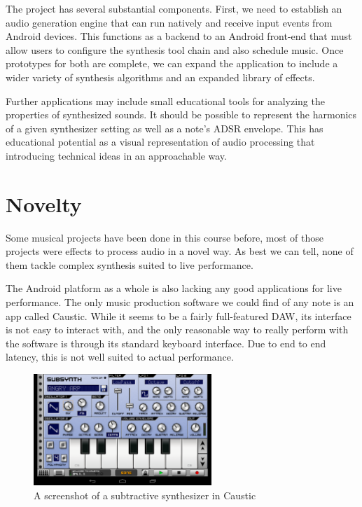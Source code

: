 \documentclass[letterpaper,12pt]{article}
\begin{document}
The project has several substantial components. First, we need to establish an
audio generation engine that can run natively and receive input events from
Android devices. This functions as a backend to an Android front-end that must
allow users to configure the synthesis tool chain and also schedule music. Once
prototypes for both are complete, we can expand the application to include
a wider variety of synthesis algorithms and an expanded library of effects.

Further applications may include small educational tools for analyzing the 
properties of synthesized sounds. It should be possible to represent the 
harmonics of a given synthesizer setting as well as a note's ADSR envelope. This 
has educational potential as a visual representation of audio processing that 
introducing technical ideas in an approachable way.


\section*{Novelty}

Some musical projects have been done in this course before, most of those
projects were effects to process audio in a novel way. As best we can tell,
none of them tackle complex synthesis suited to live performance.

The Android platform as a whole is also lacking any good applications for live
performance. The only music production software we could find of any note is an
app called Caustic\cite{caustic}. While it seems to be a fairly full-featured
DAW, its interface is not easy to interact with, and the only reasonable way to
really perform with the software is through its standard keyboard interface. Due
to end to end latency, this is not well suited to actual performance.

\begin{figure}[h]
\centering
\includegraphics[width=0.6\textwidth]{caustic.png}
\caption{A screenshot of a subtractive synthesizer in Caustic}
\label{fig:caustic}
\end{figure}
\end{document}
